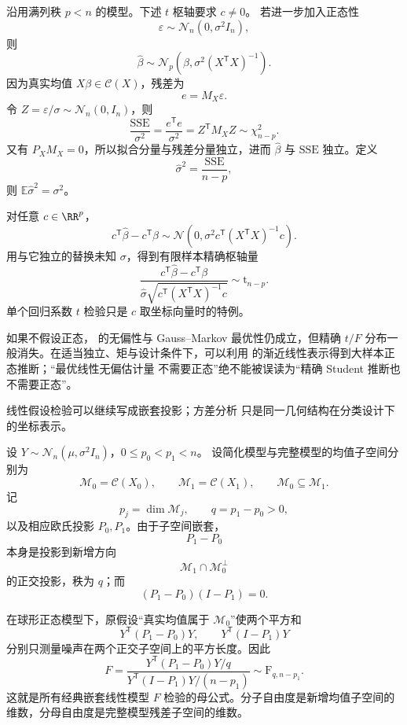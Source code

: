 \begin{theorem}
沿用满列秩 $p<n$ 的模型。下述 $t$ 枢轴要求 $c\ne0$。
若进一步加入正态性
\[
 \varepsilon\sim\mathcal N_n(0,\sigma^2I_n),
\]
则
\[
 \widehat\beta
 \sim\mathcal N_p\!\left(
 \beta,
 \sigma^2(X^{\mathsf T}X)^{-1}
 \right).
\]
因为真实均值 $X\beta\in\mathcal C(X)$，残差为
\[
 e=M_X\varepsilon.
\]
令 $Z=\varepsilon/\sigma\sim\mathcal N_n(0,I_n)$，则
\[
 \frac{\mathrm{SSE}}{\sigma^2}
 =\frac{e^{\mathsf T}e}{\sigma^2}
 =Z^{\mathsf T}M_XZ
 \sim\chi^2_{n-p}.
\]
又有 $P_XM_X=0$，所以拟合分量与残差分量独立，进而 $\widehat\beta$ 与 $\mathrm{SSE}$ 独立。定义
\begin{equation}\label{eq:math-stat-linear-model-sigma-hat}
 \widehat\sigma^2
 =\frac{\mathrm{SSE}}{n-p},
\end{equation}
则 $\mathbb E\widehat\sigma^2=\sigma^2$。

对任意 $c\in\RR^p$，
\[
 c^{\mathsf T}\widehat\beta-c^{\mathsf T}\beta
 \sim\mathcal N\!\left(
 0,
 \sigma^2c^{\mathsf T}(X^{\mathsf T}X)^{-1}c
 \right).
\]
用与它独立的替换未知 $\sigma$，得到有限样本精确枢轴量
\begin{equation*}\frac{c^{\mathsf T}\widehat\beta-c^{\mathsf T}\beta}
 {\widehat\sigma
 \sqrt{c^{\mathsf T}(X^{\mathsf T}X)^{-1}c}}
 \sim\mathrm t_{n-p}.
\end{equation*}
单个回归系数 $t$ 检验只是 $c$ 取坐标向量时的特例。

如果不假设正态， 的无偏性与 Gauss--Markov 最优性仍成立，但精确 $t/F$ 分布一般消失。在适当独立、矩与设计条件下，可以利用  的渐近线性表示得到大样本正态推断；“最优线性无偏估计量 不需要正态”绝不能被误读为“精确 Student 推断也不需要正态”。
\end{theorem}

线性假设检验可以继续写成嵌套投影；方差分析 只是同一几何结构在分类设计下的坐标表示。

\begin{theorem}[嵌套正态模型的正交平方和]
设 $Y\sim\mathcal N_n(\mu,\sigma^2I_n)$，$0\le p_0<p_1<n$。
设简化模型与完整模型的均值子空间分别为
\[
 \mathcal M_0=\mathcal C(X_0),
 \qquad
 \mathcal M_1=\mathcal C(X_1),
 \qquad
 \mathcal M_0\subseteq\mathcal M_1.
\]
记
\[
 p_j=\dim\mathcal M_j,
 \qquad
 q=p_1-p_0>0,
\]
以及相应欧氏投影 $P_0,P_1$。由于子空间嵌套，
\[
 P_1-P_0
\]
本身是投影到新增方向
\[
 \mathcal M_1\cap\mathcal M_0^\perp
\]
的正交投影，秩为 $q$；而
\[
 (P_1-P_0)(I-P_1)=0.
\]

在球形正态模型下，原假设“真实均值属于 $\mathcal M_0$”使两个平方和
\[
 Y^{\mathsf T}(P_1-P_0)Y,
 \qquad
 Y^{\mathsf T}(I-P_1)Y
\]
分别只测量噪声在两个正交子空间上的平方长度。因此
\begin{equation}\label{eq:math-stat-general-nested-f-test}
 F
 =\frac{Y^{\mathsf T}(P_1-P_0)Y/q}
 {Y^{\mathsf T}(I-P_1)Y/(n-p_1)}
 \sim\mathrm F_{q,n-p_1}.
\end{equation}
这就是所有经典嵌套线性模型 $F$ 检验的母公式。分子自由度是新增均值子空间的维数，分母自由度是完整模型残差子空间的维数。
\end{theorem}

